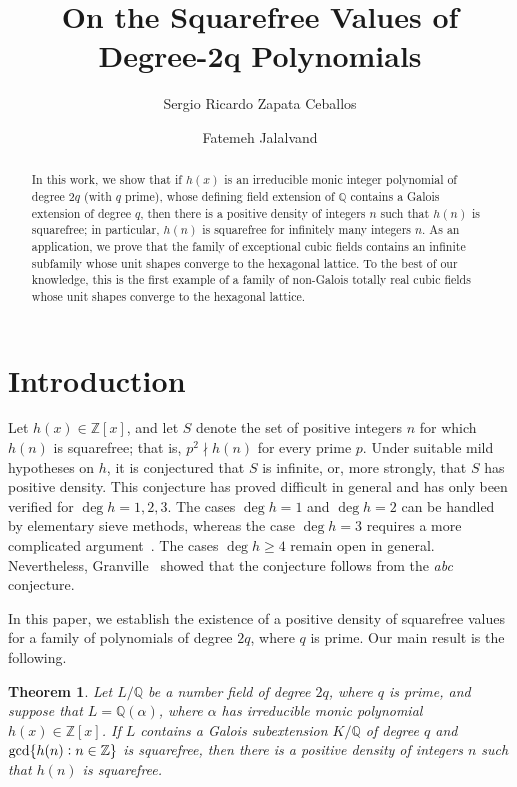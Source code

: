 \documentclass[11pt]{amsart}
\title[On the Squarefree Values of Degree-$\boldsymbol{2q}$ Polynomials]{On the Squarefree Values of Degree-$\boldsymbol{2q}$ Polynomials}
\author{Sergio Ricardo Zapata Ceballos}
\author{Fatemeh Jalalvand}
\numberwithin{equation}{section}
\newtheorem{theorem}[algorithm]{Theorem}
\theoremstyle{definition}
\newcommand{\ZZ}{\mathbb{Z}}
\newcommand{\QQ}{\mathbb{Q}}
\begin{document}
\maketitle



\begin{abstract}
    In this work, we show that if $h(x)$ is an irreducible monic integer polynomial of degree $2q$ (with $q$ prime), whose defining field extension of $\QQ$ contains a Galois extension of degree $q$, then there is a positive density of integers $n$ such that $h(n)$ is squarefree; in particular, $h(n)$ is squarefree for infinitely many integers $n$. As an application, we prove that the family of exceptional cubic fields contains an infinite subfamily whose unit shapes converge to the hexagonal lattice. To the best of our knowledge, this is the first example of a family of non-Galois totally real cubic fields whose unit shapes converge to the hexagonal lattice.
\end{abstract}

\section{Introduction}

Let $h(x)\in\mathbb{Z}[x]$, and let $S$ denote the set of positive integers $n$ for which $h(n)$ is squarefree; that is, $p^2\nmid h(n)$ for every prime $p$. Under suitable mild hypotheses on $h$, it is conjectured that $S$ is infinite, or, more strongly, that $S$ has positive density. This conjecture has proved difficult in general and has only been verified  for $\deg h = 1,2,3$. The cases $\deg h=1$ and $\deg h=2$ can be handled by elementary sieve methods, whereas the case $\deg h=3$ requires a more complicated  argument~\cite{erdos,hooley}. The cases $\deg h\geq4$ remain open in general. Nevertheless, Granville~\cite{granville} showed that the conjecture follows from the \textit{abc} conjecture.

In this paper, we establish the existence of a positive density of squarefree values for a family of polynomials of degree $2q$, where $q$ is prime. Our main result is the following.

\begin{theorem}
\label{thm: main}
    Let $L/\mathbb{Q}$ be a number field of degree $2q$, where $q$ is prime, and suppose that $L=\mathbb{Q}(\alpha)$, where $\alpha$ has irreducible monic polynomial $h(x)\in\mathbb{Z}[x]$. If $L$ contains a Galois subextension $K/\mathbb{Q}$ of degree $q$ and $\gcd\{h(n) \vcentcolon n \in \ZZ\}$ is squarefree, then there is a positive density of integers $n$ such that $h(n)$ is squarefree. 
\end{theorem}
\end{document}
